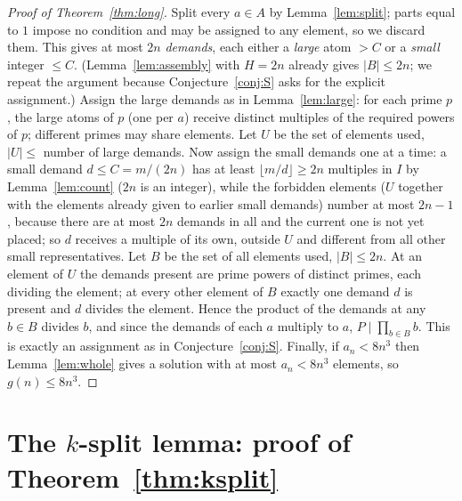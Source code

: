 \documentclass[11pt]{article}
\theoremstyle{definition}
\begin{document}
\begin{proof}[Proof of Theorem~\ref{thm:long}]
Split every $a\in A$ by Lemma~\ref{lem:split}; parts equal to $1$ impose no condition and may be assigned
to any element, so we discard them. This gives at most $2n$ \emph{demands}, each either a \emph{large} atom
$>C$ or a \emph{small} integer $\le C$. (Lemma~\ref{lem:assembly} with $H=2n$ already gives $|B|\le 2n$; we
repeat the argument because Conjecture~\ref{conj:S} asks for the explicit assignment.) Assign the large
demands as in Lemma~\ref{lem:large}: for each prime $p$, the large atoms of $p$ (one per $a$) receive
distinct multiples of the required powers of $p$; different primes may share elements. Let $U$ be the set of
elements used, $|U|\le$ number of large demands. Now assign the small demands one at a time: a small demand
$d\le C=m/(2n)$ has at least $\lfloor m/d\rfloor\ge 2n$ multiples in $I$ by Lemma~\ref{lem:count} ($2n$ is
an integer), while the forbidden elements ($U$ together with the elements already given to earlier small
demands) number at most $2n-1$, because there are at most $2n$ demands in all and the current one is not yet
placed; so $d$ receives a multiple of its own, outside $U$ and different from all other small
representatives. Let $B$ be the set of all elements used, $|B|\le 2n$. At an element of $U$ the demands
present are prime powers of distinct primes, each dividing the element; at every other element of $B$
exactly one demand $d$ is present and $d$ divides the element. Hence the product of the demands at any
$b\in B$ divides $b$, and since the demands of each $a$ multiply to $a$, $P\mid\prod_{b\in B}b$. This is
exactly an assignment as in Conjecture~\ref{conj:S}. Finally, if $a_n<8n^3$ then Lemma~\ref{lem:whole}
gives a solution with at most $a_n<8n^3$ elements, so $g(n)\le 8n^3$.
\end{proof}

\section{The $k$-split lemma: proof of Theorem~\ref{thm:ksplit}}\label{sec:ksplit}
\end{document}
